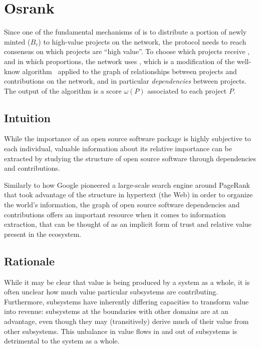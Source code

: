 \section{Osrank}
\label{s:osrank}

\def\Graph{\mathsf{Graph}}
\def\proj{\mathsf{project}}
\def\contributor{\mathsf{account}}
\def\dep{\mathsf{depend}}
\def\own{\mathsf{maintain}}
\def\coown{\mathsf{maintain}^\circ}
\def\contrib{\mathsf{contrib}}
\def\cocontrib{\mathsf{contrib}^\circ}

Since one of the fundamental mechanisms of \oscoin{} is to distribute a portion
of newly minted \oscoin{} ($B_r$) to high-value projects on the network, the protocol
needs to reach consensus on which projects are ``high value''. To choose which
projects receive \oscoin{}, and in which proportions, the network uses
\osrank{}, which is a modification of the well-know \pagerank{}
algorithm~\cite{pagerank} applied to the graph of relationships between
projects and contributions on the network, and in particular
\emph{dependencies} between projects. The output of the algorithm is a score
$\omega(P)$ associated to each project $P$.

\subsection{Intuition}

While the importance of an open source software package is highly subjective to
each individual, valuable information about its relative importance can be
extracted by studying the structure of open source software through
dependencies and contributions.

Similarly to how Google pioneered a large-scale search engine around PageRank
that took advantage of the structure in hypertext (the Web) in order
to organize the world’s information, the graph of open source software
dependencies and contributions offers an important resource when it comes to information
extraction, that can be thought of as an implicit form of trust
and relative value present in the ecosystem.

\subsection{Rationale}

While it may be clear that value is being produced by a system as a whole, it is
often unclear how much value particular subsystems are
contributing. Furthermore, subsystems have inherently differing capacities to
transform value into revenue: subsystems at the boundaries with other domains
are at an advantage, even though they may (transitively) derive much of their
value from other subsystems. This unbalance in value flows in and out of
subsystems is detrimental to the system as a whole.

